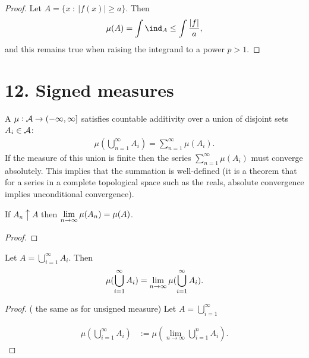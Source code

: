 \begin{proof}
  Let $A = \{x ~:~ |f(x)| \geq a\}$. Then
  \begin{align*}
    \mu(A)
    = \int \ind_A
    \leq \int \frac{|f|}{a},
  \end{align*}
  and this remains true when raising the integrand to a power $p > 1$.
\end{proof}

\section{12. Signed measures}

\begin{definition}
  A  $\mu:\mathcal A \to (-\infty, \infty]$ satisfies countable additivity over a union of disjoint
  sets $A_i \in \mathcal A$:
  \begin{align*}
    \mu(\bigcup_{n=1}^\infty A_i) = \sum_{n=1}^{\infty} \mu(A_i).
  \end{align*}
  If the measure of this union is finite then the series $\sum_{n=1}^{\infty} \mu(A_i)$ must converge
  absolutely. This implies that the summation is well-defined (it is a theorem that for a series in a complete
  topological space such as the reals, absolute convergence implies unconditional convergence).
\end{definition}

\begin{theorem}
  If $A_n \uparrow A$ then $\limn \mu(A_n) = \mu(A)$.
\end{theorem}

\begin{proof}

\end{proof}

\begin{theorem}
  Let $A = \bigcup_{i=1}^\infty A_i$. Then
  \begin{align*}
    \mu(\bigcup_{i=1}^\infty A_i) = \limn \mu(\bigcup_{i=1}^\infty A_i).
  \end{align*}
\end{theorem}

\begin{proof}
  ( the same as for unsigned measure)
  Let $A = \bigcup_{i=1}^\infty$

  \begin{align*}
    \mu(\bigcup_{i=1}^\infty A_i)
    &:= \mu(\lim_{n\to\infty} \bigcup_{i=1}^n A_i) .
  \end{align*}

\end{proof}

